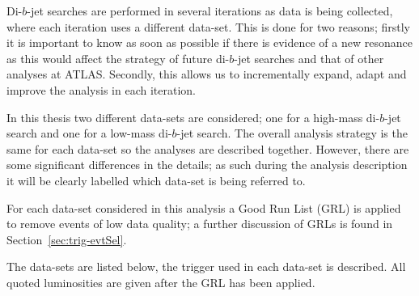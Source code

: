 Di-$b$-jet searches are performed in several iterations
as data is being collected, where each iteration uses a different data-set.
This is done for two reasons;
firstly it is important to know as soon as possible
if there is evidence of a new resonance as
this would affect the strategy of future di-$b$-jet searches and that of other analyses at ATLAS.
Secondly, this allows us to incrementally
expand, adapt and improve the analysis in each iteration.

In this thesis two different data-sets are considered;
one for a high-mass di-$b$-jet search and one for a low-mass di-$b$-jet search.
The overall analysis strategy is the same for each data-set so the analyses are described together.
However, there are some significant differences in the details;
as such during the analysis description it will be clearly labelled
which data-set is being referred to.

For each data-set considered in this analysis a Good Run List (GRL) is applied to remove events of low data quality;
a further discussion of GRLs is found in Section~\ref{sec:trig-evtSel}.

The data-sets are listed below, the trigger used in each data-set is described.
All quoted luminosities are given after the GRL has been applied.

